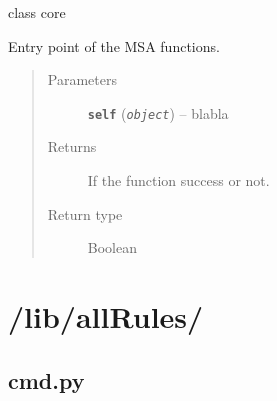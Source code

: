 \documentclass[letterpaper,10pt,oneside]{sphinxmanual}
\begin{document}
\begin{fulllineitems}
\label{index:lib.core.Core}
class core

\begin{fulllineitems}
\label{index:lib.core.Core.__init__}
\end{fulllineitems}


\begin{fulllineitems}
\label{index:lib.core.Core.run}
Entry point of the MSA functions.
\begin{quote}\begin{description}
\item[{Parameters}] \leavevmode
\textbf{\texttt{self}} (\emph{\texttt{object}}) -- blabla

\item[{Returns}] \leavevmode
If the function success or not.

\item[{Return type}] \leavevmode
Boolean

\end{description}\end{quote}

\end{fulllineitems}


\end{fulllineitems}



\chapter{/lib/allRules/}
\label{index:lib-allrules}

\section{cmd.py}
\label{index:cmd-py}\label{index:module-lib.allRules.cmd}
\end{document}
